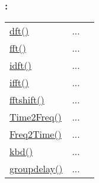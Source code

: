 \subsubsection*{: }

\textcolor{blue}{}\begin{tabular}{>{\raggedleft}p{3cm}>{\centering}p{0.5cm}l}
\textcolor{blue}{\hyperlink{dft}{dft()}}&
...&
 \begin{NoHyper} \nameref{par:Discrete-Fourier-Transform} \end{NoHyper}\tabularnewline
\textcolor{blue}{\hyperlink{fft}{fft()}}&
...&
 \begin{NoHyper} \nameref{par:Fast-Fourier-Transform} \end{NoHyper}\tabularnewline
\textcolor{blue}{\hyperlink{idft}{idft()}}&
...&
 \begin{NoHyper} \nameref{par:Inverse-Discrete-Fourier} \end{NoHyper}\tabularnewline
\textcolor{blue}{\hyperlink{ifft}{ifft()}}&
...&
 \begin{NoHyper} \nameref{par:Inverse-Fast-Fourier} \end{NoHyper}\tabularnewline
\textcolor{blue}{\hyperlink{fftshift}{fftshift()}}&
...&
 \begin{NoHyper} \nameref{par:fftshift} \end{NoHyper}\tabularnewline
\textcolor{blue}{\hyperlink{Time2Freq}{Time2Freq()}}&
...&
 \begin{NoHyper} \nameref{par:Interpreted-Discrete-Fourier-Transform} \end{NoHyper}\tabularnewline
\textcolor{blue}{\hyperlink{Freq2Time}{Freq2Time()}}&
...&
 \begin{NoHyper} \nameref{par:Interpreted-Inverse-Discrete-Fourier} \end{NoHyper}\tabularnewline
\textcolor{blue}{\hyperlink{kbd}{kbd()}}&
...&
 \begin{NoHyper} \nameref{par:Kaiser-Bessel-window} \end{NoHyper}\tabularnewline
\textcolor{blue}{\hyperlink{groupdelay}{groupdelay()}}&
...&
 \begin{NoHyper} \nameref{par:groupdelay} \end{NoHyper}\tabularnewline
\end{tabular}




\subsubsection*{}


